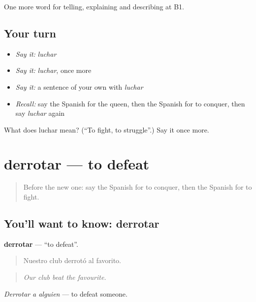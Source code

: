 \begin{grammarlens}[title={What you've built}]
One more word for telling, explaining and describing at B1.
\end{grammarlens}

\subsection*{Your turn}
\begin{itemize}
\raggedright
  \item \emph{Say it:} \emph{luchar}
  \item \emph{Say it:} \emph{luchar}, once more
  \item \emph{Say it:} a sentence of your own with \emph{luchar}
  \item \emph{Recall:} say the Spanish for the queen, then the Spanish for to conquer, then say \emph{luchar} again
\end{itemize}

\begin{tcolorbox}[breakable,colback=teal!4,colframe=teal!35!black,title={Before you move on}]
What does luchar mean? (\textquotedblleft{}To fight, to struggle\textquotedblright{}.) Say it once more.
\end{tcolorbox}
\section[derrotar]{derrotar — to defeat}

\label{lesson:ES-C569-derrotar}



\begin{quote}
Before the new one: say the Spanish for to conquer, then the Spanish for to fight.
\end{quote}

\subsection*{You'll want to know: derrotar}
\textbf{derrotar} — \textquotedblleft{}to defeat\textquotedblright{}.

\begin{quote}
Nuestro club derrotó al favorito.
\end{quote}

\begin{quote}
\emph{Our club beat the favourite.}
\end{quote}

\emph{Derrotar a alguien} — to defeat someone.

